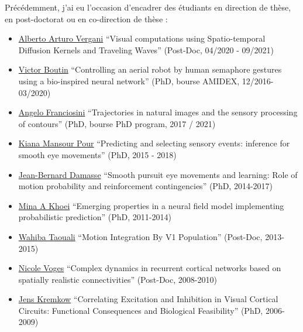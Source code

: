 \documentclass[10pt,french,a4paper,oneside]{article}%
\begin{document}
Précédemment, j'ai eu l'occasion d'encadrer des étudiants en direction de thèse, en post-doctorat ou en co-direction de thèse : %
\begin{itemize}
	\item \href{https://laurentperrinet.github.io/author/alberto-arturo-vergani/}{Alberto Arturo Vergani} 	``Visual computations using Spatio-temporal Diffusion Kernels and Traveling Waves'' (Post-Doc, 04/2020 - 09/2021)
	\item \href{https://laurentperrinet.github.io/authors/victor-boutin/}{Victor Boutin} 	``Controlling an aerial robot by human semaphore gestures using a bio-inspired neural network'' (PhD, bourse AMIDEX, 12/2016-03/2020)
	\item \href{https://laurentperrinet.github.io/authors/angelo-franciosini/}{Angelo Franciosini} ``Trajectories in natural images and the sensory processing of contours'' (PhD, bourse PhD program, 2017 / 2021)
	\item \href{https://laurentperrinet.github.io/authors/kiana-mansour-pour/}{Kiana Mansour Pour} 	``Predicting and selecting sensory events: inference for smooth eye movements'' (PhD, 2015 - 2018)
	\item \href{https://laurentperrinet.github.io/authors/jean-bernard-damasse/}{Jean-Bernard Damasse} 	``Smooth pursuit eye movements and learning: Role of motion probability and reinforcement contingencies'' (PhD, 2014-2017)
	\item \href{https://laurentperrinet.github.io/authors/mina-a-khoei/}{Mina A Khoei} 	``Emerging properties in a neural field model implementing probabilistic prediction'' (PhD, 2011-2014)
	\item \href{https://laurentperrinet.github.io/authors/wahiba-taouali/}{Wahiba Taouali} 	``Motion Integration By V1 Population'' (Post-Doc, 2013-2015)
	\item \href{https://laurentperrinet.github.io/authors/nicole-voges/}{Nicole Voges} 	``Complex dynamics in recurrent cortical networks based on spatially realistic connectivities'' (Post-Doc, 2008-2010)
	\item \href{https://laurentperrinet.github.io/authors/jens-kremkow/}{Jens Kremkow} ``Correlating Excitation and Inhibition in Visual Cortical Circuits: Functional Consequences and Biological Feasibility'' (PhD, 2006-2009)
\end{itemize}
\end{document}
